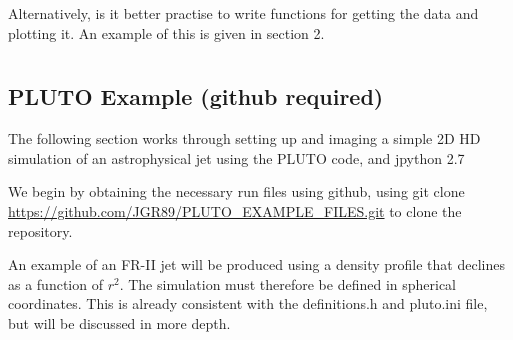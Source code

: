 \documentclass[12pt,a4paper]{report}
\begin{document}
Alternatively, is it better practise to write functions for getting the data and plotting it. An example of this is given in section 2.

\chapter{}
\section{PLUTO Example (github required)}

The following section works through setting up and imaging a simple 2D HD simulation of an astrophysical jet using the PLUTO code, and jpython 2.7

We begin by obtaining the necessary run files using github, using git clone \url{https://github.com/JGR89/PLUTO_EXAMPLE_FILES.git} to clone the repository.

An example of an FR-II jet will be produced using a density profile that declines as a function of $r^{2}$. The simulation must therefore be defined in spherical coordinates. This is already consistent with the definitions.h and pluto.ini file, but will be discussed in more depth.
\end{document}
